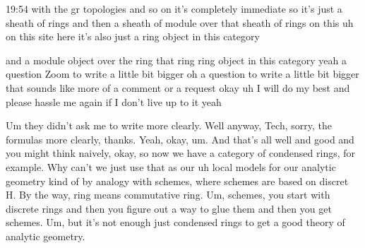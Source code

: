 \begin{unfinished}{19:54}
with the gr topologies and so on it's completely immediate so it's just a sheath of rings and then a sheath of module over that sheath of rings on this uh on this site here it's also just a ring object in this category

 and a module object over the ring that ring ring object in this category yeah a question Zoom to write a little bit bigger oh a question to write a little bit bigger that sounds like more of a comment or a request okay uh I will do my best and please hassle me again if I don't live up to it yeah

Um they didn't ask me to write more clearly. Well anyway, Tech, sorry, the formulas more clearly, thanks. Yeah, okay, um. And that's all well and good and you might think naively, okay, so now we have a category of condensed rings, for example. Why can't we just use that as our uh local models for our analytic geometry kind of by analogy with schemes, where schemes are based on discret H. By the way, ring means commutative ring. Um, schemes, you start with discrete rings and then you figure out a way to glue them and then you get schemes. Um, but it's not enough just condensed rings to get a good theory of analytic geometry.


\end{unfinished}
